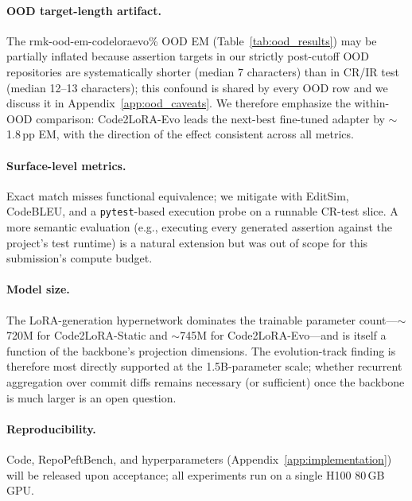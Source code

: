 \documentclass{llmxive}
\providecommand{\UseMacro}[1]{\csname rmk-#1\endcsname}
\providecommand{\codelora}{Code2LoRA\xspace}
\providecommand{\repopeftbench}{RepoPeftBench\xspace}
\providecommand{\codelorastatic}{\codelora-Static\xspace}
\providecommand{\codeloraevo}{\codelora-Evo\xspace}
\begin{document}
\paragraph{OOD target-length artifact.}
The \UseMacro{ood-em-codeloraevo}\% OOD EM (Table~\ref{tab:ood_results}) may be partially inflated because assertion targets in our strictly post-cutoff OOD repositories are systematically shorter (median 7 characters) than in CR/IR test (median 12--13 characters); this confound is shared by every OOD row and we discuss it in Appendix~\ref{app:ood_caveats}.
We therefore emphasize the within-OOD comparison: \codeloraevo{} leads the next-best fine-tuned adapter by ${\sim}$1.8\,pp EM, with the direction of the effect consistent across all metrics.

\paragraph{Surface-level metrics.}
Exact match misses functional equivalence; we mitigate with EditSim, CodeBLEU, and a \texttt{pytest}-based execution probe on a runnable CR-test slice.
A more semantic evaluation (e.g., executing every generated assertion against the project's test runtime) is a natural extension but was out of scope for this submission's compute budget.

\paragraph{Model size.}
The LoRA-generation hypernetwork dominates the trainable parameter count---${\sim}$720M for \codelorastatic{} and ${\sim}$745M for \codeloraevo{}---and is itself a function of the backbone's projection dimensions.
The evolution-track finding is therefore most directly supported at the 1.5B-parameter scale; whether recurrent aggregation over commit diffs remains necessary (or sufficient) once the backbone is much larger is an open question.

\paragraph{Reproducibility.}
Code, \repopeftbench{}, and hyperparameters (Appendix~\ref{app:implementation}) will be released upon acceptance; all experiments run on a single H100 80\,GB GPU.
\end{document}
